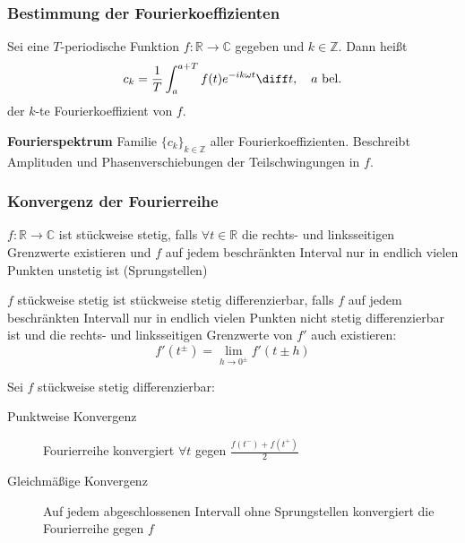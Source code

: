 \begin{sectionbox}
    \subsubsection{Bestimmung der Fourierkoeffizienten}
    \begin{emphbox}
        Sei eine $T$-periodische Funktion $f: \mathbb R \rightarrow \mathbb C$ gegeben und $k\in\mathbb Z$. Dann heißt
        \begin{equation*}
            c_k=\frac{1}{T}\int_a^{a+T} f(t)e^{-ik\omega t}\diff t, \quad a \text{ bel.}
        \end{equation*}
        der $k$-te Fourierkoeffizient von $f$.
    \end{emphbox}
    \textbf{Fourierspektrum} Familie $\{c_k\}_{k\in\mathbb Z}$ aller Fourierkoeffizienten. Beschreibt Amplituden und Phasenverschiebungen der Teilschwingungen in $f$.

    \subsubsection{Konvergenz der Fourierreihe}
    \begin{sectionbox}
        $f:\mathbb R \rightarrow \mathbb C$ ist stückweise stetig, falls $\forall t \in \mathbb R$ die rechts- und linksseitigen Grenzwerte existieren und $f$ auf jedem beschränkten Interval nur in endlich vielen Punkten unstetig ist (Sprungstellen)
    \end{sectionbox}

    \begin{sectionbox}
        $f$ stückweise stetig ist stückweise stetig differenzierbar, falls $f$ auf jedem beschränkten Intervall nur in endlich vielen Punkten nicht stetig differenzierbar ist und die rechts- und linksseitigen Grenzwerte von $f'$ auch existieren:
        \begin{equation*}
            f'(t^{\pm}) = \lim_{h\rightarrow 0^{\pm}}f'(t\pm h)
        \end{equation*}
    \end{sectionbox}

    Sei $f$ stückweise stetig differenzierbar:
    \begin{description}
        \item[Punktweise Konvergenz] Fourierreihe konvergiert $\forall t$ gegen $\frac{f(t^-) + f(t^+)}{2}$
        \item[Gleichmäßige Konvergenz] Auf jedem abgeschlossenen Intervall ohne Sprungstellen konvergiert die Fourierreihe gegen $f$
    \end{description}
\end{sectionbox}

